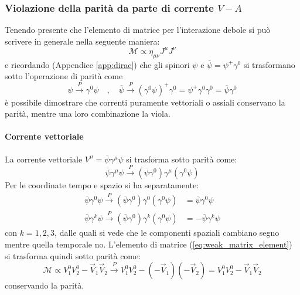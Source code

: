 \documentclass{subnucbo}
\begin{document}
\subsubsection{Violazione della parità da parte di corrente $V-A$}
Tenendo presente che l'elemento di matrice per l'interazione debole si può scrivere in generale nella seguente maniera:
\begin{equation}
        \mathcal{M} \propto \eta_{\mu\nu}J^{\mu}J^{\nu}
        \label{eq:weak_matrix_element}
\end{equation}
e ricordando (Appendice \ref{app:dirac}) che gli spinori $\psi$ e $\overline{\psi} = \psi ^ { + } \gamma ^ { 0 }$ si trasformano sotto l'operazione di parità come
\begin{equation}
        \psi \stackrel { P } { \rightarrow } \gamma ^ { 0 } \psi \quad,\quad \overline { \psi } \stackrel { P } { \rightarrow } \left( \gamma ^ { 0 } \psi \right) ^ { + } \gamma ^ { 0 } = \psi ^ { + } \gamma ^ { 0 } \gamma ^ { 0 } = \overline { \psi } \gamma ^ { 0 }
\end{equation}
è possibile dimostrare che correnti puramente vettoriali o assiali conservano la parità, mentre una loro combinazione la viola.
\paragraph{Corrente vettoriale} La corrente vettoriale $V ^ { \mu } = \overline { \psi } \gamma ^ { \mu } \psi$ si trasforma sotto parità come:
\begin{equation}
        \overline { \psi } \gamma ^ { \mu } \psi \stackrel { P } { \rightarrow } \left( \overline { \psi } \gamma ^ { 0 } \right) \gamma ^ { \mu } \left( \gamma ^ { 0 } \psi \right)
\end{equation}
Per le coordinate tempo e spazio si ha separatamente:
\begin{equation}
        \begin{aligned}
                \overline { \psi } \gamma ^ { 0 } \psi \stackrel { P } { \rightarrow } \left( \overline { \psi } \gamma ^ { 0 } \right) \gamma ^ { 0 } \left( \gamma ^ { 0 } \psi \right) & = \overline { \psi } \gamma ^ { 0 } \psi \\ \overline { \psi } \gamma ^ { k } \psi \stackrel { P } { \rightarrow } \left( \overline { \psi } \gamma ^ { 0 } \right) \gamma ^ { k } \left( \gamma ^ { 0 } \psi \right) & = - \overline { \psi } \gamma ^ { k } \psi
        \end{aligned}
\end{equation}
con $k=1,2,3$, dalle quali si vede che le componenti spaziali cambiano segno mentre quella temporale no. L'elemento di matrice (\ref{eq:weak_matrix_element}) si trasforma quindi sotto parità come:
\begin{equation}
        \mathcal{M} \propto V _ { 1 } ^ { 0 } V _ { 2 } ^ { 0 } - \vec { V } _ { 1 } \vec { V } _ { 2 } \stackrel { P } { \rightarrow } V _ { 1 } ^ { 0 } V _ { 2 } ^ { 0 } - \left( - \vec { V } _ { 1 } \right) \left( - \vec { V } _ { 2 } \right) = V _ { 1 } ^ { 0 } V _ { 2 } ^ { 0 } - \vec { V } _ { 1 } \vec { V } _ { 2 }
\end{equation}
conservando la parità.
\end{document}
